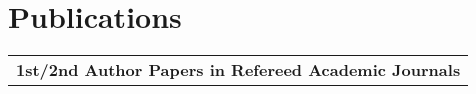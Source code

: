 \documentclass[letterpaper,10pt]{article}
\begin{document}


\section{Publications}

\begingroup
\renewcommand\arraystretch{1.2}
\vspace*{-.5em}
\begin{longtable}{rp{6.3in}}

\multicolumn{2}{c}{\textbf{1st/2nd Author Papers in Refereed Academic Journals}}      \\


\end{longtable}
\end{document}
